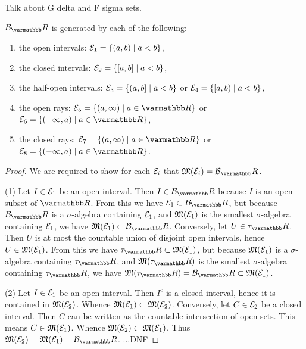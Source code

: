     {\color{red} Talk about G delta and F sigma sets}.

    \begin{proposition}\label{prop:generators-of-borel}
    $\cB_\bfR$ is generated by each of the following:
        \begin{enumerate}[label = (\arabic*),itemsep=1pt,topsep=3pt]
            \item the open intervals: $\mathcal{E}_1 = \{(a,b) \mid a < b\}$,
            \item the closed intervals: $\mathcal{E}_2 = \{[a,b] \mid a < b\}$,
            \item the half-open intervals: $\mathcal{E}_3 = \{(a,b] \mid a < b\}$ or $\mathcal{E}_4 = \{[a,b) \mid a < b\}$,
            \item the open rays: $\cE_5 = \{(a,\infty) \mid a \in \bfR\}$ or $\cE_6 = \{(-\infty,a) \mid a \in \bfR\}$,
            \item the closed rays: $\cE_7 = \{(a,\infty) \mid a \in \bfR\}$ or $\cE_8 = \{(-\infty,a) \mid a \in \bfR\}$.
        \end{enumerate}
    \end{proposition}
        \begin{proof}
            We are required to show for each $\mathcal{E}_i$ that $\fM(\cE_i) = \cB_\bfR$.

            (1) Let $I \in \mathcal{E}_1$ be an open interval. Then $I \in \cB_\bfR$ because $I$ is an open subset of $\bfR$. From this we have $\cE_1 \subset \cB_\bfR$, but because $\cB_\bfR$ is a $\sigma$-algebra containing $\mathcal{E}_1$, and $\mathfrak{M}(\mathcal{E}_1)$ is the smallest $\sigma$-algebra containing $\mathcal{E}_1$, we have $\fM(\cE_1) \subset \cB_\bfR$. Conversely, let $U \in \tau_\bfR$. Then $U$ is at most the countable union of disjoint open intervals, hence $U \in \mathfrak{M}(\mathcal{E}_1)$. From this we have $\tau_\bfR \subset \fM(\cE_1)$, but because $\mathfrak{M}(\mathcal{E}_1)$ is a $\sigma$-algebra containing $\tau_\bfR$, and $\fM(\tau_\bfR)$ is the smallest $\sigma$-algebra containing $\tau_\bfR$, we have $\fM(\tau_\bfR) = \cB_\bfR \subset \fM(\cE_1)$.

            (2) Let $I \in \mathcal{E}_1$ be an open interval. Then $I^c$ is a closed interval, hence it is contained in $\mathfrak{M}(\mathcal{E}_2)$. Whence $\mathfrak{M}(\mathcal{E}_1) \subset \mathfrak{M}(\mathcal{E}_2)$. Conversely, let $C \in \mathcal{E}_2$ be a closed interval. Then $C$ can be written as the countable intersection of open sets. This means $C \in \mathfrak{M}(\mathcal{E}_1)$. Whence $\mathfrak{M}(\mathcal{E}_2) \subset \mathfrak{M}(\mathcal{E}_1)$. Thus $\fM(\cE_2) = \fM(\cE_1) = \cB_\bfR$.
            {\color{red} ...DNF}
        \end{proof}

